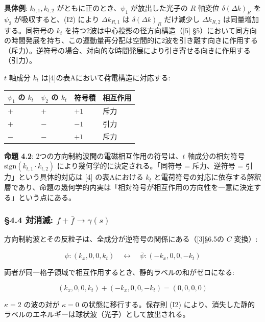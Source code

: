 \documentclass[
  a4paper,11pt]{ltjsarticle}
\newcounter{none}
\theoremstyle{definition}
\theoremstyle{remark}
\begin{document}
\textbf{具体例}: \(k_{t,1}, k_{t,2}\) がともに正のとき、\(\psi_1\)
が放出した光子の \(R\) 軸変位 \(\delta(\Delta k)_R\) を \(\psi_2\)
が吸収すると、(I2) により \(\Delta k_{R,1}\) は \(\delta(\Delta k)_R\)
だけ減少し \(\Delta k_{R,2}\) は同量増加する。同符号の \(k_t\)
を持つ2波は中心投影の径方向構造（{[}5{]}
§5）において同方向の時間発展を持ち、この運動量再分配は空間的に2波を引き離す向きに作用する（斥力）。逆符号の場合、対向的な時間発展により引き寄せる向きに作用する（引力）。

\(t\) 軸成分 \(k_t\) は{[}4{]}の表Aにおいて荷電構造に対応する:

{\def\LTcaptype{none} %
\begin{longtable}[]{@{}llll@{}}
\toprule\noalign{}
\(\psi_1\) の \(k_t\) & \(\psi_2\) の \(k_t\) & 符号積 & 相互作用 \\
\midrule\noalign{}
\endhead
\bottomrule\noalign{}
\endlastfoot
\(+\) & \(+\) & \(+1\) & 斥力 \\
\(+\) & \(-\) & \(-1\) & 引力 \\
\(-\) & \(-\) & \(+1\) & 斥力 \\
\end{longtable}
}

\textbf{命題 4.2}: 2つの方向制約波間の電磁相互作用の符号は、\(t\)
軸成分の相対符号 \(\mathrm{sign}(k_{t,1} \cdot k_{t,2})\)
により幾何学的に決定される。「同符号 = 斥力、逆符号 =
引力」という具体的対応は {[}4{]} の表Aにおける \(k_t\)
と電荷符号の対応に依存する解釈層であり、命題の幾何学的内実は「相対符号が相互作用の方向性を一意に決定する」という点にある。

\subsubsection{\texorpdfstring{§4.4 対消滅:
\(f + \bar{f} \to \gamma(s)\)}{§4.4 対消滅: f + \textbackslash bar\{f\} \textbackslash to \textbackslash gamma(s)}}\label{ux5bfeux6d88ux6ec5-f-barf-to-gammas}

方向制約波とその反粒子は、全成分が逆符号の関係にある（{[}3{]}§6.5の
\(C\) 変換）:

\[\psi: (k_x, 0, 0, k_t) \quad \longleftrightarrow \quad \bar{\psi}: (-k_x, 0, 0, -k_t)\]

両者が同一格子領域で相互作用するとき、静的ラベルの和がゼロになる:

\[(k_x, 0, 0, k_t) + (-k_x, 0, 0, -k_t) = (0, 0, 0, 0)\]

\(\kappa = 2\) の波の対が \(\kappa = 0\) の状態に移行する。保存則 (I2)
により、消失した静的ラベルのエネルギーは球状波（光子）として放出される。
\end{document}
